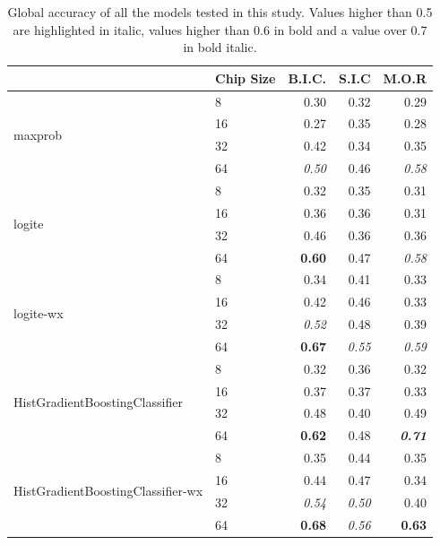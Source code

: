 \begin{table}
        \centering
\begin{tabular}{llrrr}
        \toprule
         & Chip Size & B.I.C. & S.I.C & M.O.R \\
        \midrule
        \multirow[t]{4}{*}{maxprob} & 8 & 0.30 & 0.32 & 0.29  \\
        & 16 & 0.27 & 0.35 & 0.28  \\
        & 32 & 0.42 & 0.34 & 0.35  \\
        & 64 & \textit{0.50} & 0.46 & \textit{0.58}  \\
        \cline{1-2}
        \multirow[t]{4}{*}{logite} & 8 & 0.32 & 0.35 & 0.31  \\
         & 16 & 0.36 & 0.36 & 0.31  \\
         & 32 & 0.46 & 0.36 & 0.36  \\
         & 64 & \textbf{0.60} & 0.47 & \textit{0.58} \\
        \cline{1-2}
        \multirow[t]{4}{*}{logite-wx} & 8 & 0.34 & 0.41 & 0.33  \\
         & 16 & 0.42 & 0.46 & 0.33  \\
         & 32 & \textit{0.52} & 0.48 & 0.39  \\
         & 64 & \textbf{0.67} & \textit{0.55} & \textit{0.59} \\
        \cline{1-2}
        \multirow[t]{4}{*}{HistGradientBoostingClassifier} & 8 & 0.32 & 0.36 & 0.32  \\
         & 16 & 0.37 & 0.37 & 0.33  \\
         & 32 & 0.48 & 0.40 & 0.49  \\
         & 64 & \textbf{0.62} & 0.48 & \textit{\textbf{0.71}}  \\
        \cline{1-2}
        \multirow[t]{4}{*}{HistGradientBoostingClassifier-wx} & 8 & 0.35 & 0.44 & 0.35  \\
         & 16 & 0.44 & 0.47 & 0.34  \\
         & 32 & \textit{0.54}  & \textit{0.50} & 0.40 \\
         & 64 & \textbf{0.68} & \textit{0.56} & \textbf{0.63} \\
        \bottomrule
\end{tabular}
\caption{\label{tab:global_accuracy}\footnotesize Global accuracy of all the models
tested in this study. Values higher than 0.5 are highlighted in italic, values higher than
0.6 in bold and a value over 0.7 in bold italic.}
\end{table}


